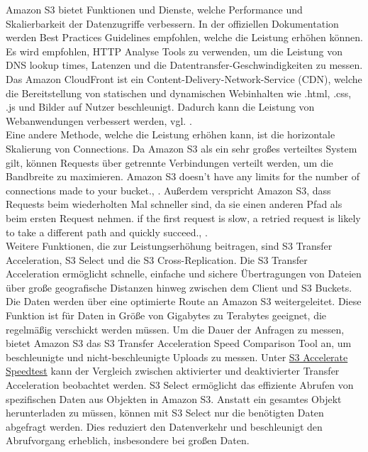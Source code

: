 Amazon S3 bietet Funktionen und Dienste, welche Performance und Skalierbarkeit der Datenzugriffe verbessern. In der offiziellen Dokumentation \cite{performance-guide} werden Best Practices Guidelines empfohlen, welche die Leistung erhöhen können. Es wird empfohlen, HTTP Analyse Tools zu verwenden, um die Leistung von DNS lookup times, Latenzen und die Datentransfer-Geschwindigkeiten zu messen.\\

Das Amazon CloudFront ist ein Content-Delivery-Network-Service (CDN), welche die Bereitstellung von statischen und dynamischen Webinhalten wie .html, .css, .js und Bilder auf Nutzer beschleunigt. Dadurch kann die Leistung von Webanwendungen verbessert werden, vgl. \cite{aws-cdn}.\\

Eine andere Methode, welche die Leistung erhöhen kann, ist die horizontale Skalierung von Connections. Da Amazon S3 als ein sehr großes verteiltes System gilt, können Requests über getrennte Verbindungen verteilt werden, um die Bandbreite zu maximieren. \glqq Amazon S3 doesn't have any limits for the number of connections made to your bucket.\grqq, \cite{performance-guide}. Außerdem verspricht Amazon S3, dass Requests beim wiederholten Mal schneller sind, da sie einen anderen Pfad als beim ersten Request nehmen. \glqq[...] if the first request is slow, a retried request is likely to take a different path and quickly succeed.\grqq, \cite{performance-guide}.\\

Weitere Funktionen, die zur Leistungserhöhung beitragen, sind S3 Transfer Acceleration, S3 Select und die S3 Cross-Replication. Die S3 Transfer Acceleration ermöglicht schnelle, einfache und sichere Übertragungen von Dateien über große geografische Distanzen hinweg zwischen dem Client und S3 Buckets. Die Daten werden über eine optimierte Route an Amazon S3 weitergeleitet. Diese Funktion ist für Daten in Größe von Gigabytes zu Terabytes geeignet, die regelmäßig verschickt werden müssen. Um die Dauer der Anfragen zu messen, bietet Amazon S3 das S3 Transfer Acceleration Speed Comparison Tool an, um beschleunigte und nicht-beschleunigte Uploads zu messen. Unter \href{https://s3-accelerate-speedtest.s3-accelerate.amazonaws.com/en/accelerate-speed-comparsion.html}{S3 Accelerate Speedtest} kann der Vergleich zwischen aktivierter und deaktivierter Transfer Acceleration beobachtet werden. S3 Select ermöglicht das effiziente Abrufen von spezifischen Daten aus Objekten in Amazon S3. Anstatt ein gesamtes Objekt herunterladen zu müssen, können mit S3 Select nur die benötigten Daten abgefragt werden. Dies reduziert den Datenverkehr und beschleunigt den Abrufvorgang erheblich, insbesondere bei großen Daten.\\

